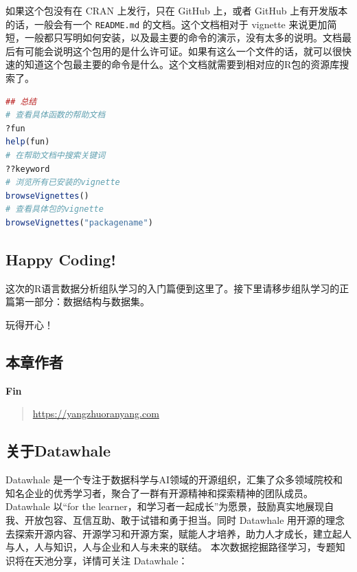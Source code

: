 \documentclass[]{ctexbook}
\newcommand{\passthrough}[1]{#1}
\begin{document}
如果这个包没有在 CRAN 上发行，只在 GitHub 上，或者 GitHub 上有开发版本的话，一般会有一个 \passthrough{\lstinline!README.md!} 的文档。这个文档相对于 vignette 来说更加简短，一般都只写明如何安装，以及最主要的命令的演示，没有太多的说明。文档最后有可能会说明这个包用的是什么许可证。如果有这么一个文件的话，就可以很快速的知道这个包最主要的命令是什么。这个文档就需要到相对应的R包的资源库搜索了。

\begin{lstlisting}[language=R]
## 总结
# 查看具体函数的帮助文档
?fun
help(fun)
# 在帮助文档中搜索关键词
??keyword
# 浏览所有已安装的vignette
browseVignettes()
# 查看具体包的vignette
browseVignettes("packagename")
\end{lstlisting}

\hypertarget{happy-coding}{%
\subsection{Happy Coding!}\label{happy-coding}}

这次的R语言数据分析组队学习的入门篇便到这里了。接下里请移步组队学习的正篇第一部分：数据结构与数据集。

玩得开心！

\hypertarget{ux672cux7ae0ux4f5cux8005}{%
\subsection*{本章作者}\label{ux672cux7ae0ux4f5cux8005}}


\textbf{Fin}

\begin{quote}
\url{https://yangzhuoranyang.com}
\end{quote}

\hypertarget{ux5173ux4e8edatawhale}{%
\subsection*{关于Datawhale}\label{ux5173ux4e8edatawhale}}


Datawhale 是一个专注于数据科学与AI领域的开源组织，汇集了众多领域院校和知名企业的优秀学习者，聚合了一群有开源精神和探索精神的团队成员。Datawhale 以``for the learner，和学习者一起成长''为愿景，鼓励真实地展现自我、开放包容、互信互助、敢于试错和勇于担当。同时 Datawhale 用开源的理念去探索开源内容、开源学习和开源方案，赋能人才培养，助力人才成长，建立起人与人，人与知识，人与企业和人与未来的联结。 本次数据挖掘路径学习，专题知识将在天池分享，详情可关注 Datawhale：
\end{document}
